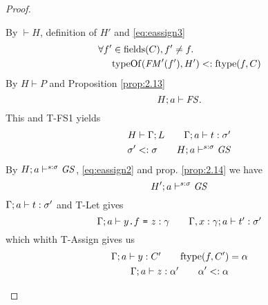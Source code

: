 \begin{proof}
\begin{description}
\begin{description}
\begin{description}
              \vspace{2em}
              By $\vdash H$, definition of $H'$ and \eqref{eq:eassign3}
              \begin{equation} \label{eq:eassign4}
                \begin{aligned}
                  \forall f' &\in \mbox{$\mathrm{fields}$}(C), f' \neq f. \\ 
                                 &\mbox{$\mathrm{typeOf}$}(\mathit{FM}'(f'), H') <: \mbox{$\mathrm{ftype}$}(f, C)
                \end{aligned}
              \end{equation}
              By $H \vdash P$ and Proposition \ref{prop:2.13}
              \begin{equation} \label{eq:eassign5}
                H;a \vdash \mathit{FS}.
              \end{equation}
              This and {\sc T-FS1} yields
              \begin{equation}\label{eq:eassign6}
                \begin{gathered}
                  H \vdash \Gamma; L \quad\quad \mbox{$\Gamma;a\vdash t:\sigma'$} \\
                  \sigma' <: \sigma \quad\quad H; a \vdash^{s: \sigma} \mathit{GS}
                \end{gathered}
              \end{equation}
              By $H;a \vdash^{s: \sigma} \mathit{GS}$, \eqref{eq:eassign2} and prop.
              \ref{prop:2.14} we have 
              \begin{equation} \label{eq:eassign7} 
                H'; a \vdash^{s: \sigma} \mathit{GS}
              \end{equation}
              $\mbox{$\Gamma;a\vdash t:\sigma'$}$ and {\sc T-Let} gives
              \begin{equation} \label{eq:eassign8}
                \mbox{$\Gamma;a\vdash\mbox{\mdseries$y$\texttt{.}$f$~\texttt{=}~$z$}:\gamma$} \quad\quad
                \mbox{$\Gamma, x: \gamma;a\vdash t':\sigma'$}
              \end{equation}
              which whith {\sc T-Assign} gives us
              \begin{equation} \label{eq:eassign9}
                \begin{gathered}
                  \mbox{$\Gamma;a\vdash y:C'$} \quad\quad \mbox{$\mathrm{ftype}$}(f, C') = \alpha \\
                  \mbox{$\Gamma;a\vdash z:\alpha'$} \quad\quad \alpha' <: \alpha
                \end{gathered}
              \end{equation}

\end{description}
\end{description}
\end{description}
\end{proof}
